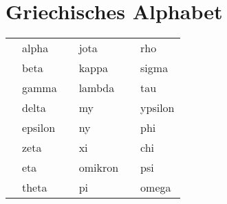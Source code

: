 \documentclass
[
  draft    = true,
  fontsize = 11pt,
  parskip  = half-,
  BCOR     = 0pt,
  DIV      = 11,
  ngerman,
  dvipsnames
]
{scrartcl}
\begin{document}

\section*{Griechisches Alphabet}
\begin{center}
\newcommand{\sbx}[1]{\scalebox{2.5}{$#1$}}%
\renewcommand{\arraystretch}{2.5}%
\begin{tabular}{ll|ll|ll}
  \sbx{\alpha}      & alpha   & \sbx{\iota}   & jota    & \sbx{\rho}     & rho     \\
  \sbx{\beta}       & beta    & \sbx{\kappa}  & kappa   & \sbx{\sigma}   & sigma   \\
  \sbx{\gamma}      & gamma   & \sbx{\lambda} & lambda  & \sbx{\tau}     & tau     \\
  \sbx{\delta}      & delta   & \sbx{\mu}     & my      & \sbx{\upsilon} & ypsilon \\
  \sbx{\varepsilon} & epsilon & \sbx{\nu}     & ny      & \sbx{\varphi}  & phi     \\
  \sbx{\zeta}       & zeta    & \sbx{\xi}     & xi      & \sbx{\chi}     & chi     \\
  \sbx{\eta}        & eta     & \sbx{o}       & omikron & \sbx{\psi}     & psi     \\
  \sbx{\vartheta}   & theta   & \sbx{\pi}     & pi      & \sbx{\omega}   & omega   \\
\end{tabular}
\end{center}

\end{document}
